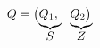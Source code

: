 \documentclass{article}
\newcommand\coolunder[2]{\mathrlap{\smash{\underbrace{\phantom{%
    \begin{matrix} #2 \end{matrix}}}_{\mbox{$#1$}}}}#2}
\begin{document}
$$Q= 
\begin{pmatrix}
\coolunder{S}{Q_1},  & \coolunder{Z}{Q_2} 
\end{pmatrix}$$
\end{document}
